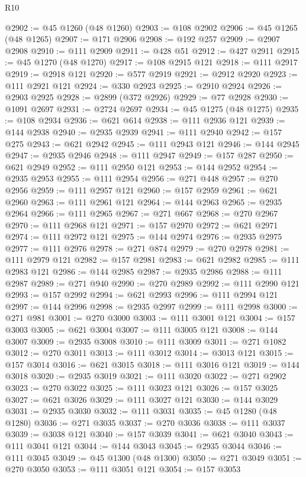 \begin{lexlean}{R10}
\begin{coremodule}
@2902 := @45 @1260 (@48 @1260)
@2903 := @108 @2902
@2906 := @45 @1265 (@48 @1265)
@2907 := @171 @2906
@2908 := @192 @257
@2909 := @2907 @2908
@2910 := @111 @2909
@2911 := @428 @51
@2912 := @427 @2911
@2915 := @45 @1270 (@48 @1270)
@2917 := @108 @2915 @121
@2918 := @111 @2917
@2919 := @2918 @121
@2920 := @577 @2919
@2921 := @2912 @2920
@2923 := @111 @2921 @121
@2924 := @330 @2923
@2925 := @2910 @2924
@2926 := @2903 @2925
@2928 := @2899 (@372 @2926)
@2929 := @77 @2928
@2930 := @1091 @2697
@2931 := @2724 @2697
@2934 := @45 @1275 (@48 @1275)
@2935 := @108 @2934
@2936 := @621 @614
@2938 := @111 @2936 @121
@2939 := @144 @2938
@2940 := @2935 @2939
@2941 := @111 @2940
@2942 := @157 @275
@2943 := @621 @2942
@2945 := @111 @2943 @121
@2946 := @144 @2945
@2947 := @2935 @2946
@2948 := @111 @2947
@2949 := @157 @287
@2950 := @621 @2949
@2952 := @111 @2950 @121
@2953 := @144 @2952
@2954 := @2935 @2953
@2955 := @111 @2954
@2956 := @271 @448
@2957 := @270 @2956
@2959 := @111 @2957 @121
@2960 := @157 @2959
@2961 := @621 @2960
@2963 := @111 @2961 @121
@2964 := @144 @2963
@2965 := @2935 @2964
@2966 := @111 @2965
@2967 := @271 @667
@2968 := @270 @2967
@2970 := @111 @2968 @121
@2971 := @157 @2970
@2972 := @621 @2971
@2974 := @111 @2972 @121
@2975 := @144 @2974
@2976 := @2935 @2975
@2977 := @111 @2976
@2978 := @271 @874
@2979 := @270 @2978
@2981 := @111 @2979 @121
@2982 := @157 @2981
@2983 := @621 @2982
@2985 := @111 @2983 @121
@2986 := @144 @2985
@2987 := @2935 @2986
@2988 := @111 @2987
@2989 := @271 @940
@2990 := @270 @2989
@2992 := @111 @2990 @121
@2993 := @157 @2992
@2994 := @621 @2993
@2996 := @111 @2994 @121
@2997 := @144 @2996
@2998 := @2935 @2997
@2999 := @111 @2998
@3000 := @271 @981
@3001 := @270 @3000
@3003 := @111 @3001 @121
@3004 := @157 @3003
@3005 := @621 @3004
@3007 := @111 @3005 @121
@3008 := @144 @3007
@3009 := @2935 @3008
@3010 := @111 @3009
@3011 := @271 @1082
@3012 := @270 @3011
@3013 := @111 @3012
@3014 := @3013 @121
@3015 := @157 @3014
@3016 := @621 @3015
@3018 := @111 @3016 @121
@3019 := @144 @3018
@3020 := @2935 @3019
@3021 := @111 @3020
@3022 := @271 @2902
@3023 := @270 @3022
@3025 := @111 @3023 @121
@3026 := @157 @3025
@3027 := @621 @3026
@3029 := @111 @3027 @121
@3030 := @144 @3029
@3031 := @2935 @3030
@3032 := @111 @3031
@3035 := @45 @1280 (@48 @1280)
@3036 := @271 @3035
@3037 := @270 @3036
@3038 := @111 @3037
@3039 := @3038 @121
@3040 := @157 @3039
@3041 := @621 @3040
@3043 := @111 @3041 @121
@3044 := @144 @3043
@3045 := @2935 @3044
@3046 := @111 @3045
@3049 := @45 @1300 (@48 @1300)
@3050 := @271 @3049
@3051 := @270 @3050
@3053 := @111 @3051 @121
@3054 := @157 @3053

\end{coremodule}
\end{lexlean}
